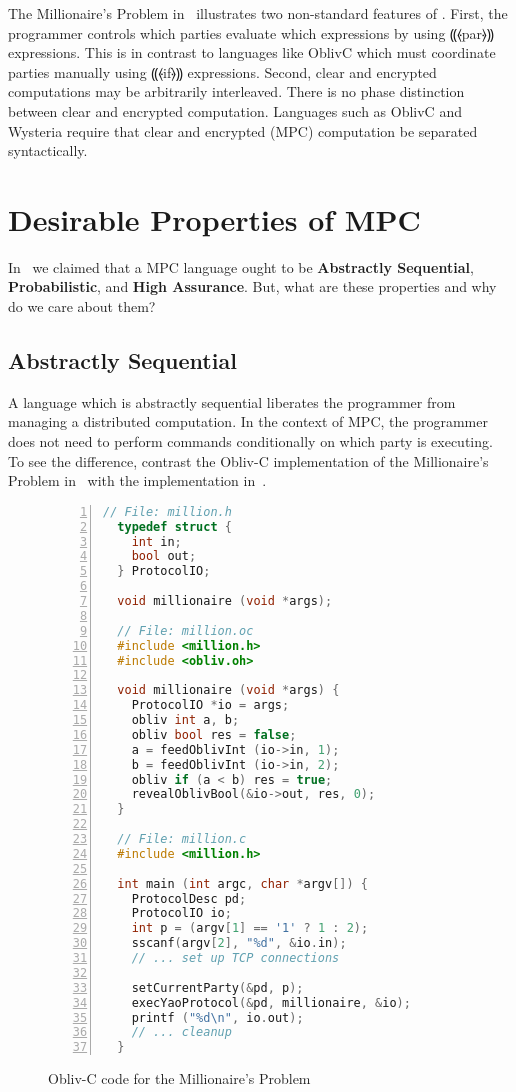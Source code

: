 The Millionaire's Problem in~ illustrates two non-standard features of \mpc. First, the programmer
controls which parties evaluate which expressions by using ⸨⦑par⦒⸩ expressions. This is in contrast to languages like OblivC
which must coordinate parties manually using ⸨⦑if⦒⸩ expressions. Second, clear and encrypted computations may be arbitrarily
interleaved. There is no phase distinction between clear and encrypted computation. Languages such as OblivC and Wysteria
require that clear and encrypted (MPC) computation be separated syntactically.

\section{Desirable Properties of MPC}
\label{sec:background-properties}

In~ we claimed that a MPC language ought to be \textbf{Abstractly Sequential}, \textbf{Probabilistic},
and \textbf{High Assurance}. But, what are these properties and why do we care about them?

\subsection{Abstractly Sequential}
\label{subsec:background-properties-centralized}

A language which is abstractly sequential liberates the programmer from managing a distributed computation. In the context of MPC,
the programmer does not need to perform commands conditionally on which party is executing. To see the difference, contrast the
Obliv-C implementation of the Millionaire's Problem in~ with the \mpc implementation
in~.

\begin{figure}[h]
\begin{lstlisting}[language=c,basicstyle=\footnotesize\ttfamily,numbers=left,stepnumber=1]
  // File: million.h
  typedef struct {
    int in;
    bool out;
  } ProtocolIO;

  void millionaire (void *args);

  // File: million.oc
  #include <million.h>
  #include <obliv.oh>

  void millionaire (void *args) {
    ProtocolIO *io = args;
    obliv int a, b;
    obliv bool res = false;
    a = feedOblivInt (io->in, 1);
    b = feedOblivInt (io->in, 2);
    obliv if (a < b) res = true;
    revealOblivBool(&io->out, res, 0);
  }

  // File: million.c
  #include <million.h>

  int main (int argc, char *argv[]) {
    ProtocolDesc pd;
    ProtocolIO io;
    int p = (argv[1] == '1' ? 1 : 2);
    sscanf(argv[2], "%d", &io.in);
    // ... set up TCP connections

    setCurrentParty(&pd, p);
    execYaoProtocol(&pd, millionaire, &io);
    printf ("%d\n", io.out);
    // ... cleanup
  }
\end{lstlisting}
\caption{Obliv-C code for the Millionaire's Problem}
\label{fig:millionaires-oblivc}
\end{figure}

